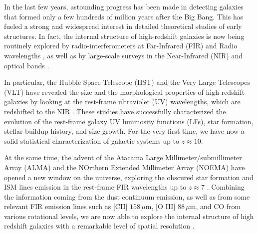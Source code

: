 \documentclass[12pt]{article}
\begin{document}
In the last few years, astounding progress has been made in detecting galaxies that formed only a few hundreds of million years after the Big Bang. This has fueled a strong and widespread interest in detailed theoretical studies of early structures.
In fact, the internal structure of high-redshift galaxies is now being routinely explored by radio-interferometers at Far-Infrared (FIR) and Radio wavelengths \citep{capak2015, decarli2016alma, Fevre:2019thf}, as well as by large-scale surveys in the Near-Infrared (NIR) and optical bands \citep{Madau:1996yh,refId0}. 

In particular, the Hubble Space Telescope (HST) and the Very Large Telescopes (VLT) have revealed the size and the morphological properties of high-redshift galaxies by looking at the rest-frame ultraviolet (UV) wavelengths, which are redshifted to the NIR \citep{oesch2009structure,Shibuya:2015qfa, bouwens2017z, kawamata2018size}. These studies have successfully characterized the evolution of the rest-frame galaxy UV luminosity functions (LFs), star formation, stellar buildup history, and size growth. For the very first time, we have now a solid statistical characterization of galactic systems up to $z\approx 10$. 

At the same time, the advent of the Atacama Large Millimeter/submillimeter Array (ALMA) and the NOrthern Extended Millimeter Array (NOEMA) have opened a new window on the universe, exploring the obscured star formation and ISM lines emission in the rest-frame FIR wavelengths up to $z\approx7$ \citep{maiolino2015,pentericci2016,knudsen2016b, matthee2017, Hashimoto2018}. Combining the information coming from the dust continuum emission, as well as from some relevant FIR emission lines such as [CII] $158 \,\mu\mathrm{m}$, [O III] $88 \,\mu\mathrm{m}$, and CO from various rotational levels, we are now able to explore the internal structure of high redshift galaxies with a remarkable level of spatial resolution \citep{capak2015, inoue2016, carniani2017, Laporte17, carniani2018, behrens2018, Tamura:2019}. 
\end{document}
